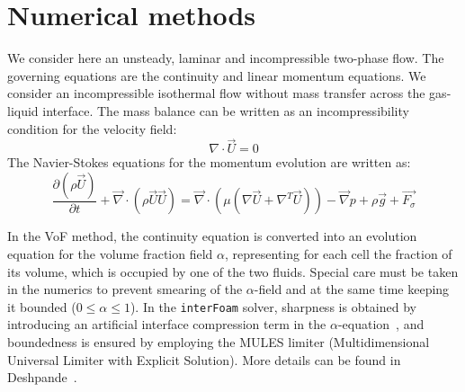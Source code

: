 \documentclass[review]{elsarticle}
\begin{document}
\section{Numerical methods}
We consider here an unsteady, laminar and incompressible two-phase flow. The governing equations are the continuity and linear momentum equations. We consider an incompressible isothermal flow without mass transfer across the gas-liquid interface. The mass balance can be written as an incompressibility condition for the velocity field:
\begin{equation}
  \nabla \cdot \overrightarrow{U} = 0
\end{equation}
The Navier-Stokes equations for the momentum evolution are written as: 
\begin{equation}
  \frac{\partial(\rho \overrightarrow{U})}{\partial t} + 
  \overrightarrow{\nabla} \cdot (\rho\overrightarrow{U}\overrightarrow{U}) = 
  \overrightarrow{\nabla} \cdot \left( \mu (\nabla\overrightarrow{U}+\nabla^T\overrightarrow{U})\right)
  - \overrightarrow{\nabla} p + \rho \overrightarrow{g} + \overrightarrow{F_{\sigma}}
\end{equation}

In the VoF method, the continuity equation is converted into an evolution equation for the volume fraction field $\alpha$, representing for each cell the fraction of its volume, which is occupied by one of the two fluids. Special care must be taken in the numerics to prevent smearing of the $\alpha$-field and at the same time keeping it bounded ($0\leq \alpha\leq 1$). In the \verb|interFoam| solver, sharpness is obtained by introducing an artificial interface compression term in the $\alpha$-equation~\cite{Weller2008}, and boundedness is ensured by employing the MULES limiter (Multidimensional Universal Limiter with Explicit Solution). More details can be found in Deshpande~\cite{Deshpande2012}.
\end{document}
